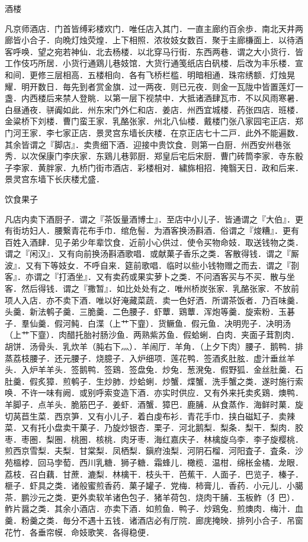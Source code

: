 \documentclass[]{article}
\begin{document}
酒楼

凡京师酒店．门首皆缚彩楼欢门．唯任店入其门．一直主廊约百余歩．南北天井两廊皆小合子．向晩灯烛荧煌．上下相照．浓妆妓女数百．聚于主廊槏面上．以待酒客呼唤．望之宛若神仙．北去杨楼．以北穿马行街．东西两巷．谓之大小货行．皆工作伎巧所居．小货行通鶏儿巷妓馆．大货行通笺纸店白矾楼．后改为丰乐楼．宣和间．更修三层相高．五楼相向．各有飞桥栏槛．明暗相通．珠帘绣额．灯烛晃耀．明开数日．毎先到者赏金旗．过一两夜．则已元夜．则金一瓦陇中皆置莲灯一盏．内西楼后来禁人登眺．以第一层下视禁中．大抵诸酒肆瓦市．不以风雨寒暑．白昼通夜．骈阗如此．州东宋门外仁和店．姜店．州西宜城楼．药张四店．班楼．金粱桥下刘楼．曹门蛮王家．乳酪张家．州北八仙楼．戴楼门张八家园宅正店．郑门河王家．李七家正店．景灵宫东墙长庆楼．在京正店七十二戸．此外不能遍数．其余皆谓之『脚店』．卖贵细下酒．迎接中贵饮食．则第一白厨．州西安州巷张秀．以次保康门李庆家．东鶏儿巷郭厨．郑皇后宅后宋厨．曹门砖筒李家．寺东骰子李家．黄胖家．九桥门街市酒店．彩楼相对．繍旆相招．掩翳天日．政和后来．景灵宫东墙下长庆楼尤盛．

饮食果子

凡店内卖下酒厨子．谓之『茶饭量酒博士』．至店中小儿子．皆通谓之『大伯』．更有街坊妇人．腰繋青花布手巾．绾危髻．为酒客换汤斟酒．俗谓之『焌糟』．更有百姓入酒肆．见子弟少年辈饮食．近前小心供过．使令买物命妓．取送钱物之类．谓之『闲汉』．又有向前换汤斟酒歌唱．或献菓子香乐之类．客散得钱．谓之『厮波』．又有下等妓女．不呼自来．筵前歌唱．临时以些小钱物赠之而去．谓之『剳客』．亦谓之『打酒坐』．又有卖药或果实萝卜之类．不问酒客买与不买．散与坐客．然后得钱．谓之『撒暂』．如比处处有之．唯州桥炭张家．乳酪张家．不放前项人入店．亦不卖下酒．唯以好淹藏菜蔬．卖一色好洒．所谓茶饭者．乃百味羹．头羹．新法鹌子羹．三脆羹．二色腰子．虾蕈．鶏蕈．浑炮等羹．旋索粉．玉碁子．羣仙羹．假河鲀．白渫（上艹下韲）．货鳜鱼．假元鱼．决明兜子．决明汤（上艹下韲）．肉醋托胎衬肠沙鱼．两熟紫苏鱼．假蛤蜊．白肉．夹面子茸割肉．胡饼．汤骨头．乳炊羊（肫右下灬）．羊闹厅．羊角．（上夕下肉）腰子．鹅鸭．排蒸荔枝腰子．还元腰子．烧臆子．入炉细项．莲花鸭．签酒炙肚胘．虚汁垂丝羊头．入炉羊羊头．签鹅鸭．签鶏．签盘兔．炒兔．葱溌兔．假野狐．金丝肚羹．石肚羹．假炙獐．煎鹌子．生炒肺．炒蛤蜊．炒蟹．煠蟹．洗手蟹之类．遂时施行索唤．不许一味有阙．或别呼索变造下酒．亦实时供应．又有外来托卖炙鶏．燠鸭．羊脚子．点羊头．脆筋巴子．姜虾．酒蟹．獐巴．鹿脯．从食蒸作．海鲜时菓．旋切莴苣生菜．西京笋．又有小儿子．着白虔布衫．青花手巾．挟白磁缸子．卖辣菜．又有托小盘卖干菓子．乃旋炒银杏．栗子．河北鹅梨．梨条．梨干．梨肉．胶枣．枣圏．梨圏．桃圏．核桃．肉牙枣．海红嘉庆子．林檎旋乌李．李子旋樱桃．煎西京雪梨．夫梨．甘棠梨．凤栖梨．鎭府浊梨．河阴石榴．河阳査子．査条．沙苑榲桲．回马孛萄．西川乳糖．狮子糖．霜蜂儿．橄榄．温柑．绵枨金橘．龙眼．荔枝．召白藕．甘蔗．漉梨．林檎干．枝头干．芭蕉干．人面子．巴览子．榛子．榧子．虾具之类．诸般蜜煎香药．菓子罐子．党梅．柿膏儿．香药．小元儿．小臈茶．鹏沙元之类．更外卖软羊诸色包子．猪羊荷包．烧肉干脯．玉板鲊（犭巴）．鲊片醤之类．其余小酒店．亦卖下酒．如煎鱼．鸭子．炒鶏兔．煎燠肉．梅汁．血羹．粉羹之类．毎分不遇十五钱．诸酒店必有厅院．廊庑掩映．排列小合子．吊窗花竹．各垂帘幙．命妓歌笑．各得稳便．
\end{document}
